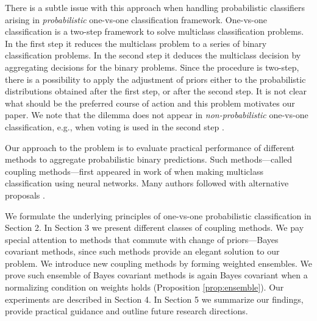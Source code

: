 There is a subtle issue with this approach  when handling probabilistic 
classifiers arising in \emph{probabilistic} one-vs-one classification framework.   
One-vs-one classification is a two-step framework to solve 
multiclass classification problems.
In the first step it reduces the multiclass problem to a series of binary
classification problems. 
In the second step it deduces the multiclass decision by aggregating decisions 
for the binary problems. Since the procedure is two-step, there is a possibility 
to apply the adjustment of priors either to the probabilistic distributions 
obtained after the first step, or after the second step. It is not clear what 
should be the preferred course of action and this problem motivates our paper. We note that the dilemma does not appear
in \emph{non-probabilistic} one-vs-one classification, e.g., when voting is used in the second step \cite{galar2011overview}.


Our approach to the problem is to evaluate practical performance of different 
methods to aggregate probabilistic binary predictions. Such methods---called coupling methods---first appeared in work of \cite{refregier1991probabilistic} when making 
multiclass classification using neural networks. 
Many authors followed with alternative proposals 
\cite{price1994pairwise, hastie1998classification,  zahorian1999partitioned,
wu2004probability, vsuch2015new, vsuch2016bayes}.

We formulate the underlying principles of one-vs-one probabilistic classification in Section 2. In Section 3 we present  different classes of coupling methods. 
We pay special attention to methods that commute with change of priors---Bayes covariant methods, 
since such methods provide an  elegant solution to our problem. 
We introduce new coupling methods by forming weighted ensembles. We prove such ensemble of Bayes covariant methods is again Bayes covariant
when a normalizing condition on weights holds (Proposition \ref{prop:ensemble}).  
Our experiments are described in Section 4. In Section 5 we summarize our findings, 
provide practical guidance and outline future research directions.